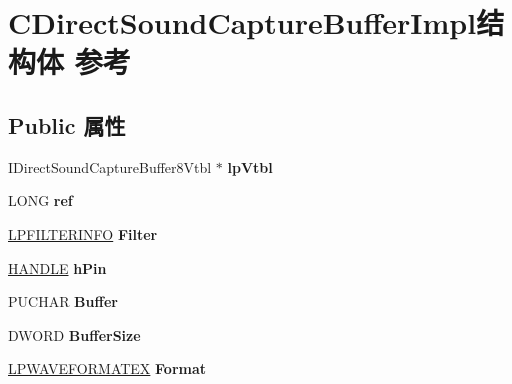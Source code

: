 \hypertarget{struct_c_direct_sound_capture_buffer_impl}{}\section{C\+Direct\+Sound\+Capture\+Buffer\+Impl结构体 参考}
\label{struct_c_direct_sound_capture_buffer_impl}
\subsection*{Public 属性}
\begin{DoxyCompactItemize}
\item 
\mbox{\label{struct_c_direct_sound_capture_buffer_impl_ad2011b236afaab9fc753d43c27fb8290}} 
I\+Direct\+Sound\+Capture\+Buffer8\+Vtbl $\ast$ {\bfseries lp\+Vtbl}
\item 
\mbox{\label{struct_c_direct_sound_capture_buffer_impl_ad2316044a539f978ea999cfa25d1d498}} 
L\+O\+NG {\bfseries ref}
\item 
\mbox{\label{struct_c_direct_sound_capture_buffer_impl_af5adcd18ac9324eb8222b319316bc925}} 
\hyperlink{structtag_f_i_l_t_e_r_i_n_f_o}{L\+P\+F\+I\+L\+T\+E\+R\+I\+N\+FO} {\bfseries Filter}
\item 
\mbox{\label{struct_c_direct_sound_capture_buffer_impl_a04c18328ff67a2360d2fa36ec579f9f6}} 
\hyperlink{interfacevoid}{H\+A\+N\+D\+LE} {\bfseries h\+Pin}
\item 
\mbox{\label{struct_c_direct_sound_capture_buffer_impl_a26ceef5fe6dfb46d0458eb3a0115bf37}} 
P\+U\+C\+H\+AR {\bfseries Buffer}
\item 
\mbox{\label{struct_c_direct_sound_capture_buffer_impl_ababbfaf3b44ccfe4f99d4e1e96712613}} 
D\+W\+O\+RD {\bfseries Buffer\+Size}
\item 
\mbox{\label{struct_c_direct_sound_capture_buffer_impl_a8016f242c3d83fe5408ed325c9a9fd14}} 
\hyperlink{struct___w_a_v_e_f_o_r_m_a_t_e_x}{L\+P\+W\+A\+V\+E\+F\+O\+R\+M\+A\+T\+EX} {\bfseries Format}

\end{DoxyCompactItemize}
